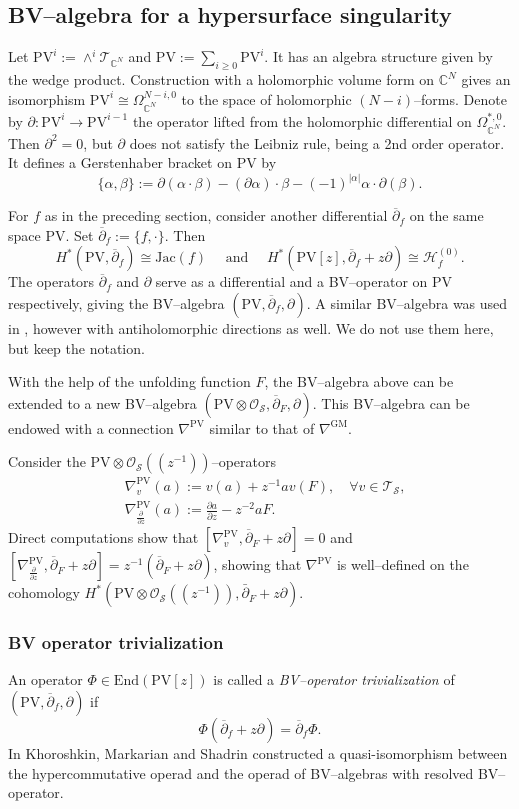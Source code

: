 \documentclass[12pt,a4paper]{amsart}
\newcommand{\CC}{{\mathbb{C}}}
\newcommand{\Jac}{\mathrm{Jac}}
\def\H{{\mathcal H}}
\def\O{{\mathcal O}}
\def\T{{\mathcal T}}
\renewcommand{\S}{{\mathcal S}}
\newcommand{\p}{{\partial}}
\newcommand{\<}{\left<}
\renewcommand{\>}{\right>}
\newcommand{\PV}{{\mathrm{PV}}}
\newcommand{\GM}{{\mathrm{GM}}}
\newcommand{\End}{{\mathrm{End}}}
\numberwithin{equation}{section}
\begin{document}
\subsection{BV--algebra for a hypersurface singularity}
Let $\PV^{i} := \wedge^i \T_{\CC^N}$ and $\PV := \sum_{i \ge 0} \PV^{i}$. It has an algebra structure given by the wedge product. Construction with a holomorphic volume form on $\CC^N$ gives an isomorphism $\PV^i \cong \Omega_{\CC^N}^{N-i,0}$ to the space of holomorphic $(N-i)$--forms. Denote by $\p: \PV^{i} \to \PV^{i-1}$ the operator lifted from the holomorphic differential on $\Omega_{\CC^N}^{\ast,0}$.
Then $\p^2 = 0$, but $\p$ does not satisfy the Leibniz rule, being a 2nd order operator. It defines a Gerstenhaber bracket on $\PV$ by
\[
\lbrace \alpha,\beta \rbrace := \p(\alpha \cdot \beta) - (\p \alpha) \cdot \beta - (-1)^{ |\alpha|} \alpha \cdot \p (\beta).
\]

For $f$ as in the preceding section, consider another differential $\overline\p_f$ on the same space $\PV$. Set $\overline\p_f := \lbrace f, \cdot \rbrace$. Then
\[
    H^\ast(\PV,\overline\p_f) \cong \Jac(f) \quad \text{ and } \quad H^\ast(\PV[z], \overline\p_f + z \p) \cong \H_f^{(0)}.
\]
The operators $\overline\p_f$ and $\p$ serve as a differential and a BV--operator on $\PV$ respectively, giving the BV--algebra $(\PV,\overline{\p}_f,\p)$. A similar BV--algebra was used in  \cite{LLS}, however with antiholomorphic directions as well. We do not use them here, but keep the notation.

With the help of the unfolding function $F$, the BV--algebra above can be extended to a new BV--algebra $(\PV\otimes\O_\S,\overline \p_F,\p)$.
This BV--algebra can be endowed with a connection $\nabla^\PV$ similar to that of $\nabla^\GM$.

Consider the $\PV \otimes \O_\S((z^{-1}))$--operators
\begin{align*}
    & \nabla_v^\PV (a) := v(a) + z^{-1} a v(F), \quad \forall v \in \T_\S,
    \\
    & \nabla_{\frac{\p}{\p z}}^\PV (a) := \frac{\p a}{\p z} - z^{-2} a F.
\end{align*}
Direct computations show that $[\nabla_v^\PV, \overline\p_F + z  \p] = 0$ and $ [\nabla_{\frac{\p}{\p z}}^\PV, \overline \p_F + z \p] = z^{-1} (\overline \p_F + z \p)$, showing that $\nabla^\PV$ is well--defined on the cohomology $H^\ast( \PV \otimes \O_\S((z^{-1})), \bar \p_F + z\p)$.

\subsubsection{BV operator trivialization}
An operator $\Phi \in \End(\PV[z])$ is called a \textit{BV--operator trivialization} of $(\PV,\overline{\p}_f,\p)$ if
\[
    \Phi (\overline{\p}_f + z \p) = \overline{\p}_f \Phi.
\]
In \cite{KMS} Khoroshkin, Markarian and Shadrin constructed a quasi-isomorphism between the hypercommutative operad and the operad of BV--algebras with resolved BV--operator.
\end{document}
